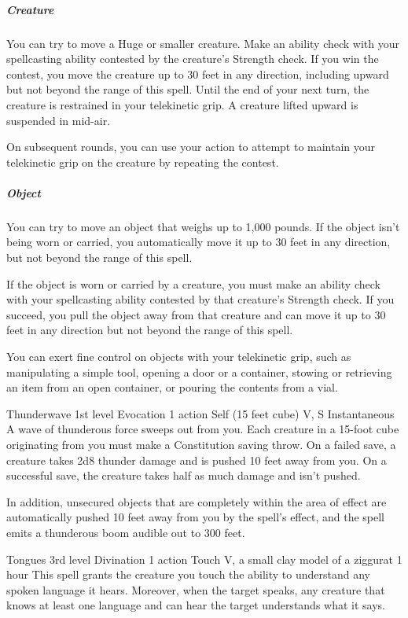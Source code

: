 \documentclass[10pt,a4paper,twoside,bg=print,twocolumn,openany,nodeprecatedcode]{dndbook}
\begin{document}
\subparagraph{Creature}
You can try to move a Huge or smaller creature. Make an ability check with your spellcasting ability contested by the creature's Strength check. If you win the contest, you move the creature up to 30 feet in any direction, including upward but not beyond the range of this spell. Until the end of your next turn, the creature is restrained in your telekinetic grip. A creature lifted upward is suspended in mid-air.

On subsequent rounds, you can use your action to attempt to maintain your telekinetic grip on the creature by repeating the contest.

\subparagraph{Object}
You can try to move an object that weighs up to 1,000 pounds. If the object isn't being worn or carried, you automatically move it up to 30 feet in any direction, but not beyond the range of this spell.

If the object is worn or carried by a creature, you must make an ability check with your spellcasting ability contested by that creature's Strength check. If you succeed, you pull the object away from that creature and can move it up to 30 feet in any direction but not beyond the range of this spell.

You can exert fine control on objects with your telekinetic grip, such as manipulating a simple tool, opening a door or a container, stowing or retrieving an item from an open container, or pouring the contents from a vial.



\DndSpellHeader%
{Thunderwave}
{1st level Evocation}
{1 action}
{Self (15 feet cube)}
{V, S}
{Instantaneous}
A wave of thunderous force sweeps out from you. Each creature in a 15-foot cube originating from you must make a Constitution saving throw. On a failed save, a creature takes 2d8 thunder damage and is pushed 10 feet away from you. On a successful save, the creature takes half as much damage and isn't pushed.

In addition, unsecured objects that are completely within the area of effect are automatically pushed 10 feet away from you by the spell's effect, and the spell emits a thunderous boom audible out to 300 feet.



\DndSpellHeader%
{Tongues}
{3rd level Divination}
{1 action}
{Touch}
{V, a small clay model of a ziggurat}
{1 hour}
This spell grants the creature you touch the ability to understand any spoken language it hears. Moreover, when the target speaks, any creature that knows at least one language and can hear the target understands what it says.
\end{document}
